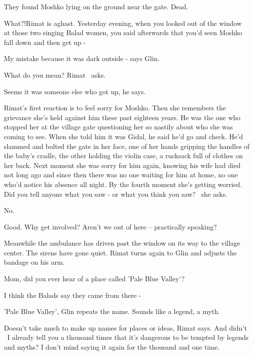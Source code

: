 \documentclass[letterpaper]{article}
\begin{document}
{\textquotedbl}They found Moshko lying on the ground near the gate. Dead.{\textquotedbl} 

{\textquotedbl}What?!{\textquotedbl}Rimat is aghast\textcolor{red}{. }{\textquotedbl}Yesterday evening, when you looked
out of the window at those two singing Balad women, you said afterwards that you'd seen Moshko fall down and then get
up -{\textquotedbl} 

{\textquotedbl}My mistake because it was dark outside -{\textquotedbl} says Glin.

{\textquotedbl}What do you mean?{\textquotedbl} Rimat \ asks. 

{\textquotedbl}Seems it was someone else who got up,{\textquotedbl} he says. 

Rimat's first reaction is to feel sorry for Moshko. Then she remembers the grievance she's held against him these
past\textcolor{red}{ }eighteen years. He was the one who stopped her at the village gate questioning her so nastily
about who she was coming to see. When she told him it was Gidal, he said he'd go and check. He'd slammed and bolted the
gate in her face, one of her hands gripping the handles of the baby's cradle, the other holding the violin case, a
rucksack full of clothes on her back. Next moment she was sorry for him again, knowing his wife had died not long ago
and since then there was no one waiting for him at home, no one who'd notice his absence all night. By the fourth
moment she's getting worried. {\textquotedbl}Did you tell anyone what you saw - or what you think you
saw?{\textquotedbl} \ she asks.

{\textquotedbl}No.{\textquotedbl}

{\textquotedbl}Good. Why get involved? Aren't we out of here -- practically speaking?{\textquotedbl} 

Meanwhile the ambulance has driven past the window on its way to the village center. The sirens have gone quiet. Rimat
turns again to Glin and adjusts the bandage on his arm.

{\textquotedbl}Mom, did you ever hear of a place called 'Pale Blue Valley'?{\textquotedbl}

{\textquotedbl}I think the Balads say they came from there -{\textquotedbl} 

{\textquotedbl}'Pale Blue Valley',{\textquotedbl} Glin repeats the name. {\textquotedbl}Sounds like a legend, a
myth.{\textquotedbl} 

{\textquotedbl}Doesn't take much to make up names for places or ideas,{\textquotedbl} Rimat says. {\textquotedbl}And
didn't \ I already tell you a thousand times that it's dangerous to be tempted by legends and myths? I don't mind
saying it again for the thousand and one time.{\textquotedbl} 
\end{document}
